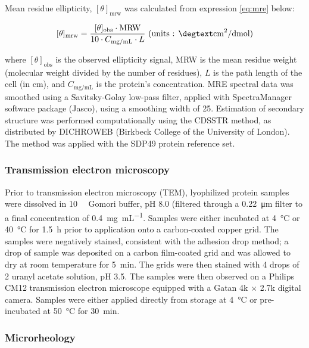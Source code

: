 \begin{refsection}
Mean residue ellipticity, $[\theta]_{\mathrm{mrw}}$ was calculated from
expression \ref{eq:mre} below:

\begin{equation}
    \label{eq:mre}
    [\theta]_{\text{mrw}}=
    \frac{[\theta]_{\text{obs}}\cdot\text{MRW}}{10\cdot{C_\text{mg/mL}}\cdot{L}}
    \text{ (units : \si{\degtext\cm\squared\per\deci\mol})}
\end{equation}

where $[\theta]_{\text{obs}}$ is the observed ellipticity signal, MRW is the
mean residue weight (molecular weight divided by the number of residues), $L$ is
the path length of the cell (in cm), and $C_\text{mg/mL}$ is the protein's
concentration.\cite{Martin2008} MRE spectral data was smoothed using a
Savitsky-Golay low-pass filter, applied with SpectraManager software package
(Jasco), using a smoothing width of 25.\cite{Savitzky1964} Estimation of
secondary structure was performed computationally using the CDSSTR method, as
distributed by DICHROWEB (Birkbeck College of the University of
London).\cite{Whitmore2008} The method was applied with the SDP49 protein
reference set.\cite{Sreerama2000a,Sreerama2000b}

\subsubsection{Transmission electron microscopy}
Prior to transmission electron microscopy (TEM), lyophilized protein samples
were dissolved in \SI{10}{\milli\moLar} Gomori buffer, pH 8.0 (filtered through
a \SI{0.22}{\um} filter to a final concentration of \SI{0.4}{\mg\per\mL}.
Samples were either incubated at \SI{4}{\celsius} or \SI{40}{\celsius} for
\SI{1.5}{\hour} prior to application onto a carbon-coated copper grid. The
samples were negatively stained, consistent with the adhesion drop method; a
drop of sample was deposited on a carbon film-coated grid and was allowed to dry
at room temperature for \SI{5}{\minute}. The grids were then stained with 4 drops
of \SI{2}{\volper} uranyl acetate solution, pH 3.5. The samples were then
observed on a Philips CM12 transmission electron microscope equipped with a
Gatan 4k ${\times}$ 2.7k digital camera. Samples were either applied directly
from storage at \SI{4}{\celsius} or pre-incubated at \SI{50}{\celsius} for
\SI{30}{\minute}.
\subsubsection{Microrheology}


\end{refsection}
